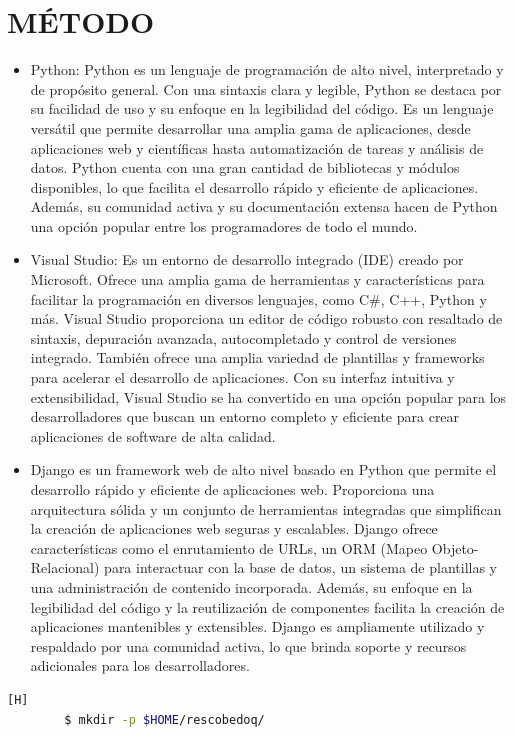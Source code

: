 \documentclass{article}
\begin{document}
\section{MÉTODO}
\begin{itemize}
\item Python: Python es un lenguaje de programación de alto nivel, interpretado y de propósito general. Con una sintaxis clara y legible, Python se destaca por su facilidad de uso y su enfoque en la legibilidad del código. Es un lenguaje versátil que permite desarrollar una amplia gama de aplicaciones, desde aplicaciones web y científicas hasta automatización de tareas y análisis de datos. Python cuenta con una gran cantidad de bibliotecas y módulos disponibles, lo que facilita el desarrollo rápido y eficiente de aplicaciones. Además, su comunidad activa y su documentación extensa hacen de Python una opción popular entre los programadores de todo el mundo.
\item Visual Studio: Es un entorno de desarrollo integrado (IDE) creado por Microsoft. Ofrece una amplia gama de herramientas y características para facilitar la programación en diversos lenguajes, como C#, C++, Python y más. Visual Studio proporciona un editor de código robusto con resaltado de sintaxis, depuración avanzada, autocompletado y control de versiones integrado. También ofrece una amplia variedad de plantillas y frameworks para acelerar el desarrollo de aplicaciones. Con su interfaz intuitiva y extensibilidad, Visual Studio se ha convertido en una opción popular para los desarrolladores que buscan un entorno completo y eficiente para crear aplicaciones de software de alta calidad.

\item Django es un framework web de alto nivel basado en Python que permite el desarrollo rápido y eficiente de aplicaciones web. Proporciona una arquitectura sólida y un conjunto de herramientas integradas que simplifican la creación de aplicaciones web seguras y escalables. Django ofrece características como el enrutamiento de URLs, un ORM (Mapeo Objeto-Relacional) para interactuar con la base de datos, un sistema de plantillas y una administración de contenido incorporada. Además, su enfoque en la legibilidad del código y la reutilización de componentes facilita la creación de aplicaciones mantenibles y extensibles. Django es ampliamente utilizado y respaldado por una comunidad activa, lo que brinda soporte y recursos adicionales para los desarrolladores.

\end{itemize}	
\begin{lstlisting}[language=bash,caption={Creando directorio de trabajo}][H]
		$ mkdir -p $HOME/rescobedoq/
	\end{lstlisting}
	
\end{document}
